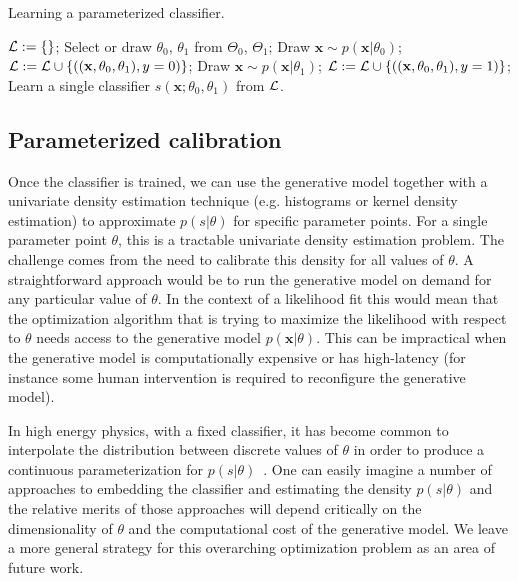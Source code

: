\documentclass[12pt]{article}
\numberwithin{equation}{section}
\theoremstyle{plain}
\begin{document}
\begin{algorithm}[t]
\caption{Learning a parameterized classifier.}\label{alg:training}
\begin{algorithmic}
    \State ${\cal L := \{ \}}$;
        \State Select or draw $\theta_0$, $\theta_1$ from $\Theta_0$, $\Theta_1$;
	    \State Draw $\mathbf{x} \sim p(\mathbf{x}|\theta_0)$;
		\State ${\cal L} := {\cal L} \cup \{ ((\mathbf{x}, \theta_0, \theta_1), y=0) \}$;
		\State Draw $\mathbf{x} \sim p(\mathbf{x}|\theta_1)$;
		\State ${\cal L} := {\cal L} \cup \{ ((\mathbf{x}, \theta_0, \theta_1), y=1) \}$;
    \EndWhile
    \State Learn a single classifier $s(\mathbf{x}; \theta_0, \theta_1)$ from ${\cal L}$.
\end{algorithmic}
\end{algorithm}


\subsection{Parameterized calibration}
\label{sec:param-calibration}

Once the classifier is trained, we can use the generative model together with a
univariate density estimation technique (e.g. histograms or kernel density
estimation) to approximate $p(s|\theta)$ for specific parameter
points. For a single parameter point $\theta$, this is a tractable univariate density
estimation problem. The challenge comes from the need to calibrate this density
for all values of $\theta$. A straightforward approach would be to run the
generative model on demand for any particular value of $\theta$. In the context
of a likelihood fit this would mean that the optimization algorithm that is
trying to maximize the likelihood with respect to $\theta$ needs access to the
generative model $p(\mathbf{x}|\theta)$. This can be  impractical when the generative
model is computationally expensive or has high-latency (for instance some human
intervention is required to reconfigure the generative model).

In high energy physics, with a
fixed classifier, it has become common  to interpolate the distribution between
discrete values of $\theta$ in order to produce a continuous parameterization for
$p(s | \theta)$~\citep{read1999linear,Cranmer:2012sba,baak2015interpolation}.
One can easily imagine a number of approaches to embedding the classifier and
estimating the density $p(s|\theta)$ and the relative merits of those
approaches will depend critically on the dimensionality of $\theta$ and the
computational cost of the generative model. We leave a more general strategy for
this overarching optimization problem as an area of future work.
\end{document}
